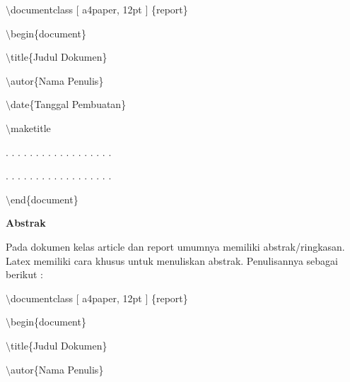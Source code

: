 $\setminus$documentclass $[$ a4paper, 12pt $]$ \{report\}\par \vspace{12pt}

$\setminus$begin\{document\}\par \vspace{12pt}

$\setminus$title\{Judul Dokumen\}\par \vspace{12pt}

$\setminus$autor\{Nama Penulis\}\par \vspace{12pt}

$\setminus$date\{Tanggal Pembuatan\}\par \vspace{12pt}

$\setminus$maketitle\par \vspace{12pt}

. . . . . . . . . . . . . . . . . .

. . . . . . . . . . . . . . . . . .\par \vspace{12pt}

$\setminus$end\{document\}\par \vspace{12pt}



\textbf{Abstrak}\par \vspace{12pt}

Pada dokumen kelas article dan report umumnya memiliki 
abstrak/ringkasan. Latex memiliki cara khusus untuk menuliskan abstrak. Penulisannya sebagai berikut :\par \vspace{12pt}

$\setminus$documentclass $[$ a4paper, 12pt $]$ \{report\}\par \vspace{12pt}

$\setminus$begin\{document\}\par \vspace{12pt}

$\setminus$title\{Judul Dokumen\}\par \vspace{12pt}

$\setminus$autor\{Nama Penulis\}\par \vspace{12pt}


